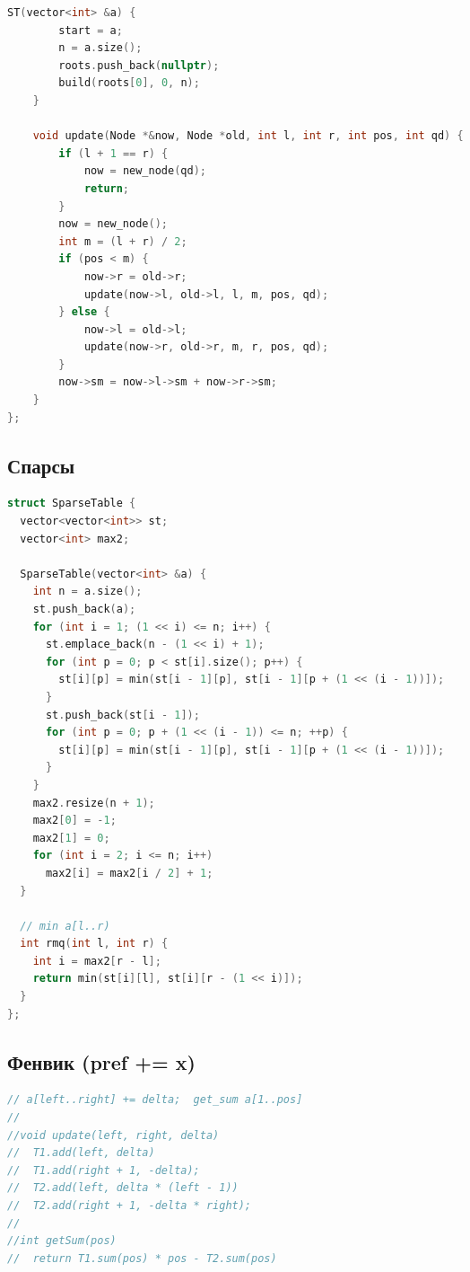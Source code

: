 \documentclass[10pt,a4paper,landscape,twosided]{extarticle}
\begin{document}
\begin{multicols*}{3}
\begin{lstlisting}[language=C++]
    ST(vector<int> &a) {
        start = a;
        n = a.size();
        roots.push_back(nullptr);
        build(roots[0], 0, n);
    }

    void update(Node *&now, Node *old, int l, int r, int pos, int qd) {
        if (l + 1 == r) {
            now = new_node(qd);
            return;
        }
        now = new_node();
        int m = (l + r) / 2;
        if (pos < m) {
            now->r = old->r;
            update(now->l, old->l, l, m, pos, qd);
        } else {
            now->l = old->l;
            update(now->r, old->r, m, r, pos, qd);
        }
        now->sm = now->l->sm + now->r->sm;
    }
};

\end{lstlisting}

\subsection{Спарсы}
\begin{lstlisting}[language=C++]
struct SparseTable {
  vector<vector<int>> st;
  vector<int> max2;

  SparseTable(vector<int> &a) {
    int n = a.size();
    st.push_back(a);
    for (int i = 1; (1 << i) <= n; i++) {
      st.emplace_back(n - (1 << i) + 1);
      for (int p = 0; p < st[i].size(); p++) {
        st[i][p] = min(st[i - 1][p], st[i - 1][p + (1 << (i - 1))]);
      }
      st.push_back(st[i - 1]);
      for (int p = 0; p + (1 << (i - 1)) <= n; ++p) {
        st[i][p] = min(st[i - 1][p], st[i - 1][p + (1 << (i - 1))]);
      }
    }
    max2.resize(n + 1);
    max2[0] = -1;
    max2[1] = 0;
    for (int i = 2; i <= n; i++)
      max2[i] = max2[i / 2] + 1;
  }

  // min a[l..r)
  int rmq(int l, int r) {
    int i = max2[r - l];
    return min(st[i][l], st[i][r - (1 << i)]);
  }
};
\end{lstlisting}

\subsection{Фенвик (pref += x)}
\begin{lstlisting}[language=C++]
// a[left..right] += delta;  get_sum a[1..pos]
//
//void update(left, right, delta)
//  T1.add(left, delta)
//  T1.add(right + 1, -delta);
//  T2.add(left, delta * (left - 1))
//  T2.add(right + 1, -delta * right);
//
//int getSum(pos)
//  return T1.sum(pos) * pos - T2.sum(pos)

\end{lstlisting}


\end{multicols*}
\end{document}
